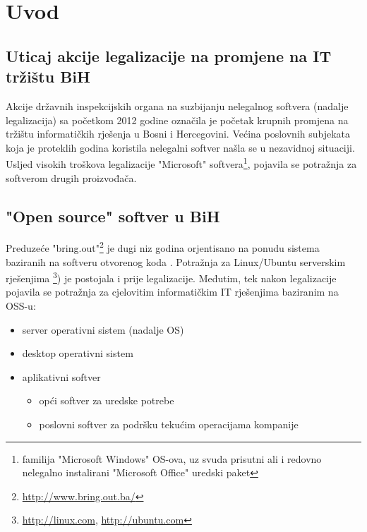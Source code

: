 \documentclass[times, utf8, seminar]{fit}
\begin{document}

\chapter{Uvod}

\section{Uticaj akcije legalizacije na promjene na IT tržištu BiH}

Akcije državnih inspekcijskih organa na suzbijanju nelegalnog softvera (nadalje legalizacija) sa početkom 2012 godine označila je početak krupnih promjena na tržištu informatičkih  rješenja u Bosni i Hercegovini. 
Većina poslovnih subjekata koja je proteklih godina koristila nelegalni softver  našla se u nezavidnoj situaciji.
Usljed visokih troškova legalizacije "Microsoft" softvera\footnote{familija "Microsoft Windows" OS-ova, uz svuda prisutni ali i redovno nelegalno instalirani "Microsoft Office" uredski paket}, pojavila se potražnja za softverom drugih proizvođača.  

\section{"Open source" softver u BiH}

Preduzeće "bring.out"\footnote{\url{http://www.bring.out.ba/}} je dugi niz godina orjentisano na ponudu sistema baziranih na softveru otvorenog koda .
Potražnja za Linux/Ubuntu serverskim rješenjima \footnote{\url{http://linux.com}, \url{http://ubuntu.com}}) je postojala i prije legalizacije. Međutim, tek nakon legalizacije pojavila se potražnja za cjelovitim informatičkim IT rješenjima baziranim na OSS-u:
\begin{itemize}
  \item server operativni sistem (nadalje OS)
  \item desktop operativni sistem
  \item aplikativni softver
  \begin{itemize}
    \item opći softver za uredske potrebe
    \item poslovni softver za podršku tekućim operacijama kompanije 
  \end{itemize}
\end{itemize}
\end{document}
